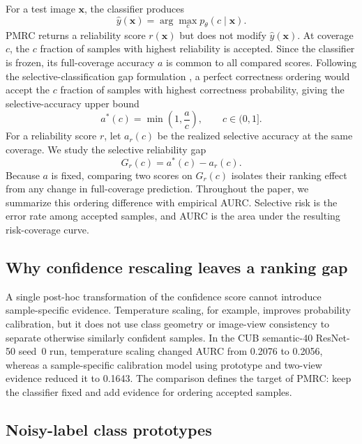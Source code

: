 \documentclass[review,times]{elsarticle}
\newcommand{\method}{PMRC}
\newcommand{\vect}[1]{\mathbf{#1}}
\begin{document}
For a test image $\vect{x}$, the classifier produces
\begin{equation}
  \hat y(\vect{x})=\arg\max_c p_\theta(c\mid\vect{x}).
  \label{eq:prediction}
\end{equation}
\method{} returns a reliability score $r(\vect{x})$ but does not modify $\hat y(\vect{x})$. At coverage $c$, the $c$ fraction of samples with highest reliability is accepted. Since the classifier is frozen, its full-coverage accuracy $a$ is common to all compared scores. Following the selective-classification gap formulation \citep{rabanser2025selectivegap}, a perfect correctness ordering would accept the $c$ fraction of samples with highest correctness probability, giving the selective-accuracy upper bound
\begin{equation}
  a^*(c)=\min\left(1,\frac{a}{c}\right),\qquad c\in(0,1].
  \label{eq:oracle}
\end{equation}
For a reliability score $r$, let $a_r(c)$ be the realized selective accuracy at the same coverage. We study the selective reliability gap
\begin{equation}
  G_r(c)=a^*(c)-a_r(c).
  \label{eq:gap}
\end{equation}
Because $a$ is fixed, comparing two scores on $G_r(c)$ isolates their ranking effect from any change in full-coverage prediction. Throughout the paper, we summarize this ordering difference with empirical AURC. Selective risk is the error rate among accepted samples, and AURC is the area under the resulting risk-coverage curve.

\subsection{Why confidence rescaling leaves a ranking gap}

A single post-hoc transformation of the confidence score cannot introduce sample-specific evidence. Temperature scaling, for example, improves probability calibration, but it does not use class geometry or image-view consistency to separate otherwise similarly confident samples. In the CUB semantic-40 ResNet-50 seed~0 run, temperature scaling changed AURC from 0.2076 to 0.2056, whereas a sample-specific calibration model using prototype and two-view evidence reduced it to 0.1643. The comparison defines the target of PMRC: keep the classifier fixed and add evidence for ordering accepted samples.

\subsection{Noisy-label class prototypes}
\end{document}
